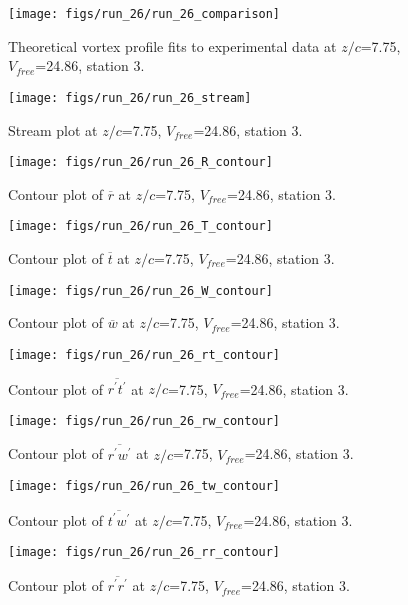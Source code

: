 \begin{figure}[H]
\centering
\texttt{[image: figs/run\_26/run\_26\_comparison]}
\caption{Theoretical vortex profile fits to experimental data at $z/c$=7.75, $V_{free}$=24.86, station 3.}
\end{figure}


\begin{figure}[H]
\centering
\texttt{[image: figs/run\_26/run\_26\_stream]}
\caption{Stream plot at $z/c$=7.75, $V_{free}$=24.86, station 3.}
\end{figure}


\begin{figure}[H]
\centering
\texttt{[image: figs/run\_26/run\_26\_R\_contour]}
\caption{Contour plot of $\overline{r}$ at $z/c$=7.75, $V_{free}$=24.86, station 3.}
\end{figure}


\begin{figure}[H]
\centering
\texttt{[image: figs/run\_26/run\_26\_T\_contour]}
\caption{Contour plot of $\overline{t}$ at $z/c$=7.75, $V_{free}$=24.86, station 3.}
\end{figure}


\begin{figure}[H]
\centering
\texttt{[image: figs/run\_26/run\_26\_W\_contour]}
\caption{Contour plot of $\overline{w}$ at $z/c$=7.75, $V_{free}$=24.86, station 3.}
\end{figure}


\begin{figure}[H]
\centering
\texttt{[image: figs/run\_26/run\_26\_rt\_contour]}
\caption{Contour plot of $\overline{r^\prime t^\prime}$ at $z/c$=7.75, $V_{free}$=24.86, station 3.}
\end{figure}


\begin{figure}[H]
\centering
\texttt{[image: figs/run\_26/run\_26\_rw\_contour]}
\caption{Contour plot of $\overline{r^\prime w^\prime}$ at $z/c$=7.75, $V_{free}$=24.86, station 3.}
\end{figure}


\begin{figure}[H]
\centering
\texttt{[image: figs/run\_26/run\_26\_tw\_contour]}
\caption{Contour plot of $\overline{t^\prime w^\prime}$ at $z/c$=7.75, $V_{free}$=24.86, station 3.}
\end{figure}


\begin{figure}[H]
\centering
\texttt{[image: figs/run\_26/run\_26\_rr\_contour]}
\caption{Contour plot of $\overline{r^\prime r^\prime}$ at $z/c$=7.75, $V_{free}$=24.86, station 3.}
\end{figure}


